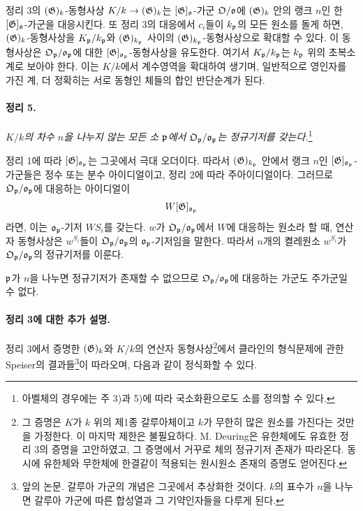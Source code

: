 정리 3의 \((\mathfrak G)_k\)-동형사상 \(K/k\to(\mathfrak G)_k\)는 \([\mathfrak G]_\mathfrak o\)-가군 \(\mathfrak O/\mathfrak o\)에 \((\mathfrak G)_k\) 안의 랭크 \(n\)인 한 \([\mathfrak G]_\mathfrak o\)-가군을 대응시킨다. 또 정리 3의 대응에서 \(c_i\)들이 \(k_\mathfrak p\)의 모든 원소를 돌게 하면, \((\mathfrak G)_k\)-동형사상을 \(K_\mathfrak p/k_\mathfrak p\)와 \((\mathfrak G)_{k_\mathfrak p}\) 사이의 \((\mathfrak G)_{k_\mathfrak p}\)-동형사상으로 확대할 수 있다. 이 동형사상은 \(\mathfrak O_\mathfrak p/\mathfrak o_\mathfrak p\)에 대한 \([\mathfrak G]_{\mathfrak o_\mathfrak p}\)-동형사상을 유도한다. 여기서 \(K_\mathfrak p/k_\mathfrak p\)는 \(k_\mathfrak p\) 위의 초복소계로 보아야 한다. 이는 \(K/k\)에서 계수영역을 확대하여 생기며, 일반적으로 영인자를 가진 계, 더 정확히는 서로 동형인 체들의 합인 반단순계가 된다.

\paragraph{정리 5.}
\emph{\(K/k\)의 차수 \(n\)을 나누지 않는 모든 소 \(\mathfrak p\)에서 \(\mathfrak O_\mathfrak p/\mathfrak o_\mathfrak p\)는 정규기저를 갖는다.}\footnote{아벨체의 경우에는 주 3)과 5)에 따라 국소화환으로도 소를 정의할 수 있다.}

정리 1에 따라 \([\mathfrak G]_{\mathfrak o_\mathfrak p}\)는 그곳에서 극대 오더이다. 따라서 \((\mathfrak G)_{k_\mathfrak p}\) 안에서 랭크 \(n\)인 \([\mathfrak G]_{\mathfrak o_\mathfrak p}\)-가군들은 정수 또는 분수 아이디얼이고, 정리 2에 따라 주아이디얼이다. 그러므로 \(\mathfrak O_\mathfrak p/\mathfrak o_\mathfrak p\)에 대응하는 아이디얼이
\[
W[\mathfrak G]_{\mathfrak o_\mathfrak p}
\]
라면, 이는 \(\mathfrak o_\mathfrak p\)-기저 \(WS_i\)를 갖는다. \(w\)가 \(\mathfrak O_\mathfrak p/\mathfrak o_\mathfrak p\)에서 \(W\)에 대응하는 원소라 할 때, 연산자 동형사상은 \(w^{S_i}\)들이 \(\mathfrak O_\mathfrak p/\mathfrak o_\mathfrak p\)의 \(\mathfrak o_\mathfrak p\)-기저임을 말한다. 따라서 \(n\)개의 켤레원소 \(w^{S_i}\)가 \(\mathfrak O_\mathfrak p/\mathfrak o_\mathfrak p\)의 정규기저를 이룬다.

\(\mathfrak p\)가 \(n\)을 나누면 정규기저가 존재할 수 없으므로 \(\mathfrak O_\mathfrak p/\mathfrak o_\mathfrak p\)에 대응하는 가군도 주가군일 수 없다.

\paragraph{정리 3에 대한 추가 설명.}
정리 3에서 증명한 \((\mathfrak G)_k\)와 \(K/k\)의 연산자 동형사상\footnote{그 증명은 \(K\)가 \(k\) 위의 제1종 갈루아체이고 \(k\)가 무한히 많은 원소를 가진다는 것만을 가정한다. 이 마지막 제한은 불필요하다. M. Deuring은 유한체에도 유효한 정리 3의 증명을 고안하였고, 그 증명에서 거꾸로 체의 정규기저 존재가 따라온다. 동시에 유한체와 무한체에 한결같이 적용되는 원시원소 존재의 증명도 얻어진다.}에서 클라인의 형식문제에 관한 Speiser의 결과들\footnote{앞의 논문. 갈루아 가군의 개념은 그곳에서 추상화한 것이다. \(k\)의 표수가 \(n\)을 나누면 갈루아 가군에 따른 합성열과 그 기약인자들을 다루게 된다.}이 따라오며, 다음과 같이 정식화할 수 있다.

